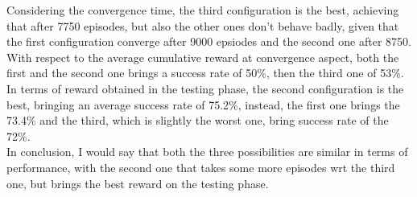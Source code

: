 \documentclass{article}
\begin{document}
\begin{center}
\centering
{}
\end{center}

\begin{center}
\centering
{}
\end{center}

\clearpage


Considering the convergence time, the third configuration is the best, achieving that after 7750 episodes, but also the other ones don't behave badly, given that the first configuration converge after 
9000 epsiodes and the second one after 8750.
\\
With respect to the average cumulative reward at convergence aspect, both the first and the second one brings a success rate of 50\%, then the third one of 53\%.
\\
In terms of reward obtained in the testing phase, the second configuration is the best, bringing an average success rate of 75.2\%, instead, the first one brings the 73.4\% and the third,
which is slightly the worst one, bring success rate of the 72\%.
\\
In conclusion, I would say that both the three possibilities are similar in terms of performance, with the second one that takes some more episodes wrt the third one, but brings the best reward on the testing phase.
\end{document}
